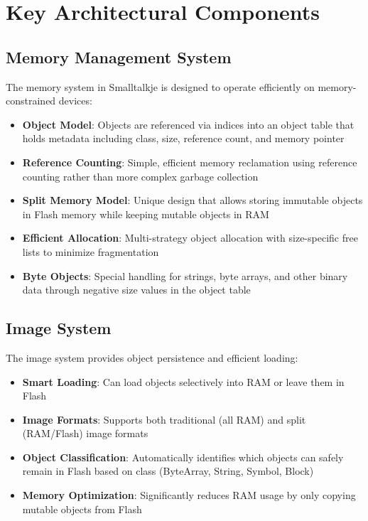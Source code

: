 \documentclass[12pt,a4paper]{report}
\begin{document}
\section{Key Architectural Components}

\subsection{Memory Management System}
The memory system in Smalltalkje is designed to operate efficiently on memory-constrained devices:

\begin{itemize}
    \item \textbf{Object Model}: Objects are referenced via indices into an object table that holds metadata including class, size, reference count, and memory pointer
    \item \textbf{Reference Counting}: Simple, efficient memory reclamation using reference counting rather than more complex garbage collection
    \item \textbf{Split Memory Model}: Unique design that allows storing immutable objects in Flash memory while keeping mutable objects in RAM
    \item \textbf{Efficient Allocation}: Multi-strategy object allocation with size-specific free lists to minimize fragmentation
    \item \textbf{Byte Objects}: Special handling for strings, byte arrays, and other binary data through negative size values in the object table
\end{itemize}

\subsection{Image System}
The image system provides object persistence and efficient loading:

\begin{itemize}
    \item \textbf{Smart Loading}: Can load objects selectively into RAM or leave them in Flash
    \item \textbf{Image Formats}: Supports both traditional (all RAM) and split (RAM/Flash) image formats
    \item \textbf{Object Classification}: Automatically identifies which objects can safely remain in Flash based on class (ByteArray, String, Symbol, Block)
    \item \textbf{Memory Optimization}: Significantly reduces RAM usage by only copying mutable objects from Flash
\end{itemize}
\end{document}
